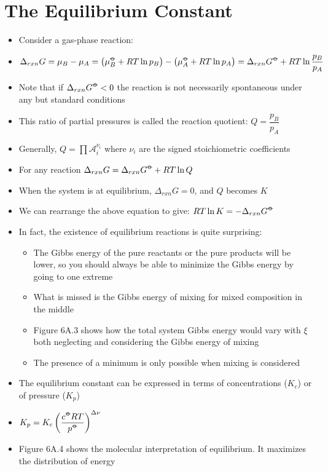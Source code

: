\documentclass[12pt, openany, letterpaper]{memoir}
\begin{document}
\section{The Equilibrium Constant}
\begin{itemize}
	\item Consider a gas-phase reaction: 
	\item $\Delta_{rxn}G = \mu_B-\mu_A = \left(\mu_B^{\std}+RT\ln p_B\right)-\left(\mu_A^{\std}+RT\ln p_A\right)=\Delta_{rxn}G^{\std} + RT\ln\dfrac{p_B}{p_A}$
	\item Note that if $\Delta_{rxn}G^{\std}<0$ the reaction is not necessarily spontaneous under any but standard conditions
	\item This ratio of partial pressures is called the reaction quotient: $Q=\dfrac{p_B}{p_A}$
	\item Generally, $Q=\prod\mathcal{A}_i^{\nu_i}$ where $\nu_i$ are the signed stoichiometric coefficients
	\item For any reaction $\Delta_{rxn}G = \Delta_{rxn}G^{\std} + RT\ln Q$
	\item When the system is at equilibrium, $\Delta_{rxn}G=0$, and $Q$ becomes $K$
	\item We can rearrange the above equation to give: $RT\ln K = -\Delta_{rxn}G^{\std}$
	\item In fact, the existence of equilibrium reactions is quite surprising:
	      \begin{itemize}
		      \item The Gibbs energy of the pure reactants or the pure products will be lower, so you should always be able to minimize the Gibbs energy by going to one extreme
		      \item What is missed is the Gibbs energy of mixing for mixed composition in the middle
		      \item Figure 6A.3 shows how the total system Gibbs energy would vary with $\xi$ both neglecting and considering the Gibbs energy of mixing
		      \item The presence of a minimum is only possible when mixing is considered
	      \end{itemize}
	\item The equilibrium constant can be expressed in terms of concentrations ($K_c$) or of pressure ($K_p$)
	\item $K_p=K_c\left(\dfrac{c^{\std}RT}{p^{\std}}\right)^{\Delta \nu}$
	\item Figure 6A.4 shows the molecular interpretation of equilibrium. It maximizes the distribution of energy
\end{itemize}
\end{document}
